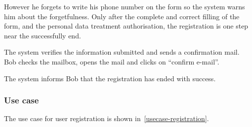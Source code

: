However he forgets to write his phone number on the form so the system warns him about the forgetfulness.
Only after the complete and correct filling of the form, and the personal data treatment authorisation, the registration is one step near the successfully end.

The system verifies the information submitted and sends a confirmation mail.
Bob checks the mailbox, opens the mail and clicks on ``confirm e-mail''.

The system informs Bob that the registration has ended with success.

\subsubsection{Use case}
The use case for user registration is shown in~\autoref{usecase-registration}.

